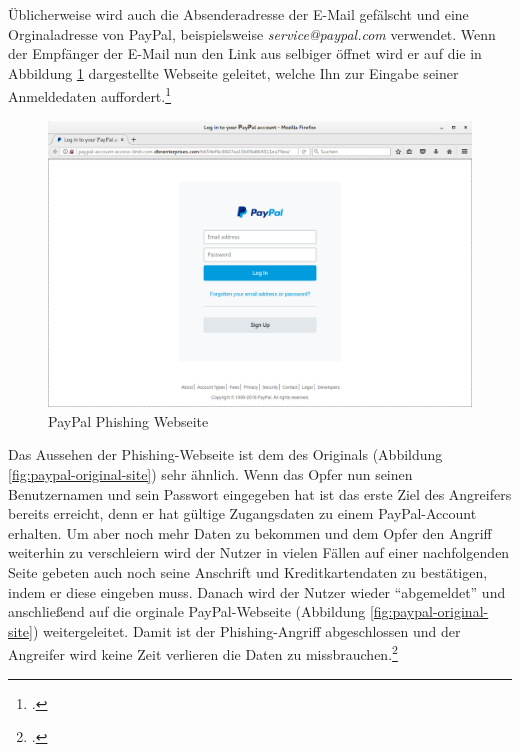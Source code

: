 Üblicherweise wird auch die Absenderadresse der E-Mail gefälscht und eine Orginaladresse von
PayPal, beispielsweise \textit{service@paypal.com} verwendet. Wenn der Empfänger der E-Mail nun den
Link aus selbiger öffnet wird er auf die in Abbildung \ref{fig:paypal-phishing-site} dargestellte
Webseite geleitet, welche Ihn zur Eingabe seiner Anmeldedaten auffordert.\footcite[Vgl.][10]{phishing}

\begin{figure}[H]
  \centering
  \includegraphics[width=15cm]{images/paypal-phishing-site}
  \caption{PayPal Phishing Webseite}
  \label{fig:paypal-phishing-site}
\end{figure}

Das Aussehen der Phishing-Webseite ist dem des Originals (Abbildung \ref{fig:paypal-original-site})
sehr ähnlich. Wenn das Opfer nun seinen Benutzernamen und sein Passwort eingegeben hat ist das erste
Ziel des Angreifers bereits erreicht, denn er hat gültige Zugangsdaten zu einem PayPal-Account
erhalten. Um aber noch mehr Daten zu bekommen und dem Opfer den Angriff weiterhin zu verschleiern
wird der Nutzer in vielen Fällen auf einer nachfolgenden Seite gebeten auch noch seine Anschrift
und Kreditkartendaten zu bestätigen, indem er diese eingeben muss. Danach wird der Nutzer
wieder \enquote{abgemeldet} und anschließend auf die orginale PayPal-Webseite (Abbildung
\ref{fig:paypal-original-site}) weitergeleitet. Damit ist der Phishing-Angriff abgeschlossen und
der Angreifer wird keine Zeit verlieren die Daten zu missbrauchen.\footcite[Vgl.][10\psqq]{phishing}

